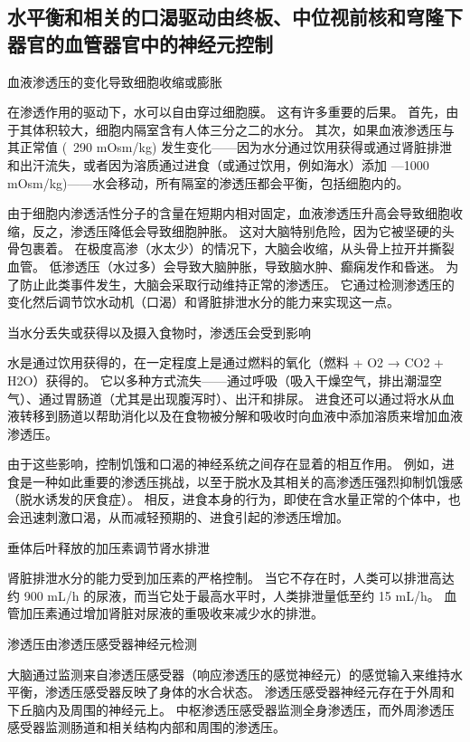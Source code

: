 \subsection{水平衡和相关的口渴驱动由终板、中位视前核和穹隆下器官的血管器官中的神经元控制}

血液渗透压的变化导致细胞收缩或膨胀

在渗透作用的驱动下，水可以自由穿过细胞膜。
这有许多重要的后果。
首先，由于其体积较大，细胞内隔室含有人体三分之二的水分。
其次，如果血液渗透压与其正常值 (~290 mOsm/kg) 发生变化——因为水分通过饮用获得或通过肾脏排泄和出汗流失，或者因为溶质通过进食（或通过饮用，例如海水）添加 —1000 mOsm/kg)——水会移动，所有隔室的渗透压都会平衡，包括细胞内的。


由于细胞内渗透活性分子的含量在短期内相对固定，血液渗透压升高会导致细胞收缩，反之，渗透压降低会导致细胞肿胀。
这对大脑特别危险，因为它被坚硬的头骨包裹着。
在极度高渗（水太少）的情况下，大脑会收缩，从头骨上拉开并撕裂血管。
低渗透压（水过多）会导致大脑肿胀，导致脑水肿、癫痫发作和昏迷。
为了防止此类事件发生，大脑会采取行动维持正常的渗透压。
它通过检测渗透压的变化然后调节饮水动机（口渴）和肾脏排泄水分的能力来实现这一点。


当水分丢失或获得以及摄入食物时，渗透压会受到影响

水是通过饮用获得的，在一定程度上是通过燃料的氧化（燃料 + O2 → CO2 + H2O）获得的。
它以多种方式流失——通过呼吸（吸入干燥空气，排出潮湿空气）、通过胃肠道（尤其是出现腹泻时）、出汗和排尿。
进食还可以通过将水从血液转移到肠道以帮助消化以及在食物被分解和吸收时向血液中添加溶质来增加血液渗透压。


由于这些影响，控制饥饿和口渴的神经系统之间存在显着的相互作用。
例如，进食是一种如此重要的渗透压挑战，以至于脱水及其相关的高渗透压强烈抑制饥饿感（脱水诱发的厌食症）。
相反，进食本身的行为，即使在含水量正常的个体中，也会迅速刺激口渴，从而减轻预期的、进食引起的渗透压增加。


垂体后叶释放的加压素调节肾水排泄

肾脏排泄水分的能力受到加压素的严格控制。
当它不存在时，人类可以排泄高达约 900 mL/h 的尿液，而当它处于最高水平时，人类排泄量低至约 15 mL/h。
血管加压素通过增加肾脏对尿液的重吸收来减少水的排泄。


渗透压由渗透压感受器神经元检测

大脑通过监测来自渗透压感受器（响应渗透压的感觉神经元）的感觉输入来维持水平衡，渗透压感受器反映了身体的水合状态。
渗透压感受器神经元存在于外周和下丘脑内及周围的神经元上。
中枢渗透压感受器监测全身渗透压，而外周渗透压感受器监测肠道和相关结构内部和周围的渗透压。


